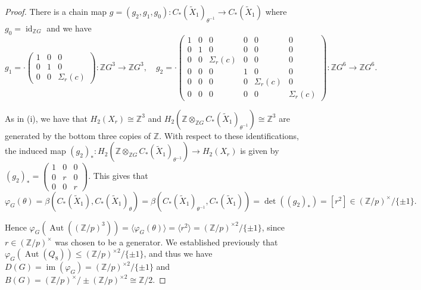 \documentclass[11pt,a4paper,leqno]{amsart}
\theoremstyle{definition}
\theoremstyle{remark}
\newcommand{\wt}{\widetilde}
\newcommand{\Z}{\mathbb{Z}}
\DeclareMathOperator{\Aut}{Aut}
\DeclareMathOperator{\id}{id}
\DeclareMathOperator{\IM}{im}
\begin{document}
\begin{proof}
There is a chain map $g = (g_2,g_1,g_0) : C_*(\wt X_1)_{\theta^{-1}} \to C_*(\wt X_1)$ where $g_0 = \id_{\Z G}$ and we have 
\[ g_1 = \cdot \left(\begin{smallmatrix}
	1 & 0 & 0 \\
	0 & 1 & 0 \\
	0 & 0 & \Sigma_r(c)
\end{smallmatrix}\right) : \Z G^3 \to \Z G^3, \quad 
g_2 = \cdot \left(\begin{smallmatrix}
1 & 0 & 0 & 0 & 0 & 0 \\
0 & 1 & 0 & 0 & 0 & 0 \\
0 & 0 & \Sigma_r(c) & 0 & 0 & 0 \\
0 & 0 & 0 & 1 & 0 & 0 \\
0 & 0 & 0 & 0 & \Sigma_r(c) & 0 \\
0 & 0 & 0 & 0 & 0 & \Sigma_r(c)
\end{smallmatrix}\right)  : \Z G^6 \to \Z G^6.  \]

As in (i), we have that $H_2(X_r) \cong \Z^3$ and $H_2(\Z \otimes_{\Z G} C_*(\wt X_1)_{\theta^{-1}}) \cong \Z^3$ are generated by the bottom three copies of $\Z$. With respect to these identifications, the induced map $(g_2)_* : H_2(\Z \otimes_{\Z G} C_*(\wt X_1)_{\theta^{-1}}) \to H_2(X_r)$ is given by $(g_2)_* = \left(\begin{smallmatrix}
	1 & 0 & 0 \\ 0 & r & 0 \\ 0 & 0 & r
\end{smallmatrix}\right)$. This gives that
\[ \varphi_G(\theta) = \beta(C_*(\wt X_1),C_*(\wt X_1)_{\theta}) = \beta(C_*(\wt X_1)_{\theta^{-1}},C_*(\wt X_1)) = \det((g_2)_*) = [r^2] \in (\Z/p)^\times/\{\pm 1\}. \]

Hence $\varphi_G(\Aut((\Z/p)^3)) = \langle \varphi_G(\theta) \rangle = \langle r^2 \rangle = (\Z/p)^{\times 2}/\{\pm 1\}$, since $r \in (\Z/p)^\times$ was chosen to be a generator. We established previously that $\varphi_G(\Aut(Q_8)) \le (\Z/p)^{\times 2}/\{\pm 1\}$, and thus we have $D(G) = \IM(\varphi_G) = (\Z/p)^{\times 2}/\{\pm 1\}$ and $B(G) = (\Z/p)^\times/\pm(\Z/p)^{\times 2} \cong \Z/2$.
\end{proof}
\end{document}
